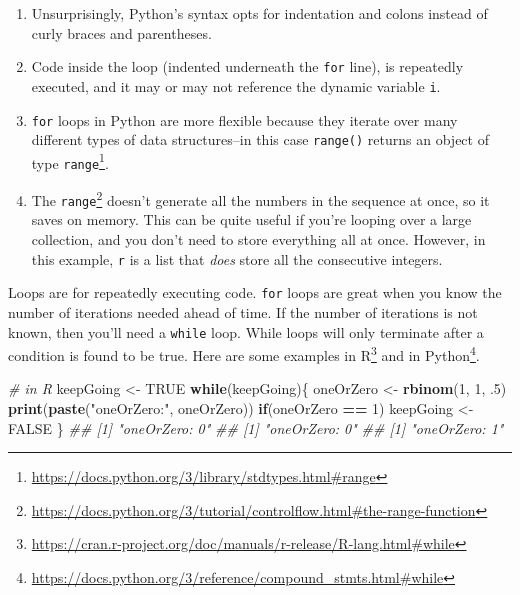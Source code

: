 \documentclass[12pt,krantz2]{krantz}
\makeatletter
\newenvironment{Shaded}{\begin{snugshade}}{\end{snugshade}}
\newcommand{\CommentTok}[1]{\textcolor[rgb]{0.37,0.37,0.37}{\textit{#1}}}
\newcommand{\ControlFlowTok}[1]{\textcolor[rgb]{0.27,0.27,0.27}{\textbf{#1}}}
\newcommand{\DecValTok}[1]{\textcolor[rgb]{0.06,0.06,0.06}{#1}}
\newcommand{\FloatTok}[1]{\textcolor[rgb]{0.06,0.06,0.06}{#1}}
\newcommand{\KeywordTok}[1]{\textcolor[rgb]{0.27,0.27,0.27}{\textbf{#1}}}
\newcommand{\NormalTok}[1]{#1}
\newcommand{\OperatorTok}[1]{\textcolor[rgb]{0.43,0.43,0.43}{\textbf{#1}}}
\newcommand{\OtherTok}[1]{\textcolor[rgb]{0.37,0.37,0.37}{#1}}
\newcommand{\StringTok}[1]{\textcolor[rgb]{0.5,0.5,0.5}{#1}}
\providecommand{\tightlist}{%
  \setlength{\itemsep}{0pt}\setlength{\parskip}{0pt}}
\renewcommand{\href}[2]{#2\footnote{\url{#1}}}
\newenvironment{kframe}{%
\medskip{}
\setlength{\fboxsep}{.8em}
 \def\at@end@of@kframe{}%
 \ifinner\ifhmode%
  \def\at@end@of@kframe{\end{minipage}}%
  \begin{minipage}{\columnwidth}%
 \fi\fi%
 \def\FrameCommand##1{\hskip\@totalleftmargin \hskip-\fboxsep
 \colorbox{shadecolor}{##1}\hskip-\fboxsep
     \hskip-\linewidth \hskip-\@totalleftmargin \hskip\columnwidth}%
 \MakeFramed {\advance\hsize-\width
   \@totalleftmargin\z@ \linewidth\hsize
   \@setminipage}}%
 {\par\unskip\endMakeFramed%
 \at@end@of@kframe}
\renewenvironment{Shaded}{\begin{kframe}}{\end{kframe}}
\makeatother
\begin{document}
\begin{enumerate}
\def\labelenumi{\arabic{enumi}.}
\tightlist
\item
  Unsurprisingly, Python's syntax opts for indentation and colons instead of curly braces and parentheses.
\item
  Code inside the loop (indented underneath the \texttt{for} line), is repeatedly executed, and it may or may not reference the dynamic variable \texttt{i}.
\item
  \texttt{for} loops in Python are more flexible because they iterate over many different types of data structures--in this case \href{https://docs.python.org/3/library/stdtypes.html\#range}{\texttt{range()} returns an object of type \texttt{range}}.
\item
  The \href{https://docs.python.org/3/tutorial/controlflow.html\#the-range-function}{\texttt{range}} doesn't generate all the numbers in the sequence at once, so it saves on memory. This can be quite useful if you're looping over a large collection, and you don't need to store everything all at once. However, in this example, \texttt{r} is a list that \emph{does} store all the consecutive integers.
\end{enumerate}

Loops are for repeatedly executing code. \texttt{for} loops are great when you know the number of iterations needed ahead of time. If the number of iterations is not known, then you'll need a \texttt{while} loop. While loops will only terminate after a condition is found to be true. Here are some examples \href{https://cran.r-project.org/doc/manuals/r-release/R-lang.html\#while}{in R} and \href{https://docs.python.org/3/reference/compound_stmts.html\#while}{in Python}.

\begin{Shaded}
\begin{Highlighting}[]
\CommentTok{# in R}
\NormalTok{keepGoing <-}\StringTok{ }\OtherTok{TRUE}
\ControlFlowTok{while}\NormalTok{(keepGoing)\{}
\NormalTok{  oneOrZero <-}\StringTok{ }\KeywordTok{rbinom}\NormalTok{(}\DecValTok{1}\NormalTok{, }\DecValTok{1}\NormalTok{, }\FloatTok{.5}\NormalTok{)}
  \KeywordTok{print}\NormalTok{(}\KeywordTok{paste}\NormalTok{(}\StringTok{"oneOrZero:"}\NormalTok{, oneOrZero))}
  \ControlFlowTok{if}\NormalTok{(oneOrZero }\OperatorTok{==}\StringTok{ }\DecValTok{1}\NormalTok{)}
\NormalTok{    keepGoing <-}\StringTok{ }\OtherTok{FALSE}
\NormalTok{\}}
\CommentTok{## [1] "oneOrZero: 0"}
\CommentTok{## [1] "oneOrZero: 0"}
\CommentTok{## [1] "oneOrZero: 1"}
\end{Highlighting}
\end{Shaded}
\end{document}
